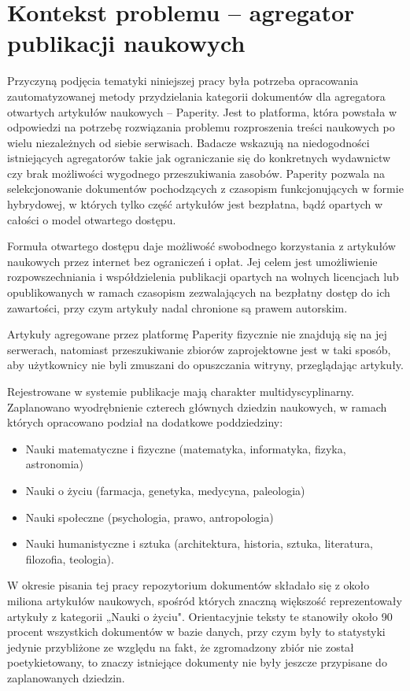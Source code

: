 \documentclass{pracamgr}
\begin{document}
\section{Kontekst problemu – agregator publikacji naukowych}
Przyczyną podjęcia tematyki niniejszej pracy była potrzeba opracowania zautomatyzowanej metody przydzielania kategorii dokumentów dla agregatora otwartych artykułów naukowych – Paperity. Jest to platforma, która powstała w odpowiedzi na potrzebę rozwiązania problemu rozproszenia treści naukowych po wielu niezależnych od siebie serwisach. Badacze wskazują na niedogodności istniejących agregatorów takie jak ograniczanie się do konkretnych wydawnictw czy brak możliwości wygodnego przeszukiwania zasobów. Paperity pozwala na selekcjonowanie dokumentów pochodzących z czasopism funkcjonujących w formie hybrydowej, w których tylko część artykułów jest bezpłatna, bądź opartych w całości o model otwartego dostępu. 

Formuła otwartego dostępu daje możliwość swobodnego korzystania z artykułów naukowych przez internet bez ograniczeń i opłat. Jej celem jest umożliwienie rozpowszechniania i współdzielenia publikacji opartych na wolnych licencjach lub opublikowanych w ramach czasopism zezwalających na bezpłatny dostęp do ich zawartości, przy czym artykuły nadal chronione są prawem autorskim.

Artykuły agregowane przez platformę Paperity fizycznie nie znajdują się na jej serwerach, natomiast przeszukiwanie zbiorów zaprojektowne jest w taki sposób, aby użytkownicy nie byli zmuszani do opuszczania witryny, przeglądając artykuły.

Rejestrowane w systemie publikacje mają charakter multidyscyplinarny. Zaplanowano wyodrębnienie czterech głównych dziedzin naukowych, w ramach których opracowano podział na dodatkowe poddziedziny:

\begin{itemize} %
    \item Nauki matematyczne i fizyczne (matematyka, informatyka, fizyka, astronomia)
    \item Nauki o życiu (farmacja, genetyka, medycyna, paleologia)
    \item Nauki społeczne (psychologia, prawo, antropologia)
    \item Nauki humanistyczne i sztuka (architektura, historia, sztuka, literatura, filozofia, teologia).
\end{itemize}

W okresie pisania tej pracy repozytorium dokumentów składało się z około miliona artykułów naukowych, spośród których znaczną większość reprezentowały artykuły z kategorii „Nauki o życiu". Orientacyjnie teksty te stanowiły około 90 procent wszystkich dokumentów w bazie danych, przy czym były to statystyki jedynie przybliżone ze względu na fakt, że zgromadzony zbiór nie został poetykietowany, to znaczy istniejące dokumenty nie były jeszcze przypisane do zaplanowanych dziedzin. 
\end{document}
